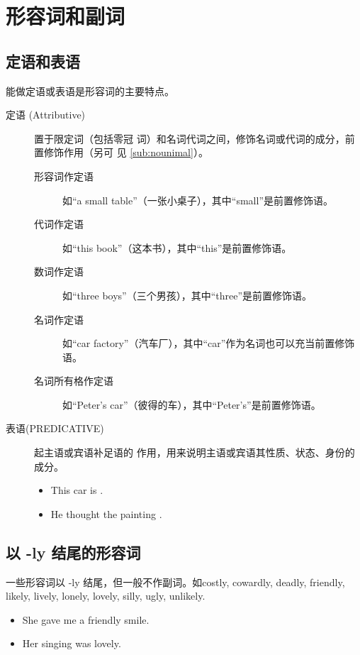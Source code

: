 \section{形容词和副词}

\subsection{定语和表语}
\label{sub:attrpred}

能做定语或表语是形容词的主要特点。

\begin{description}
\item[定语 (Attributive)]  置于限定词（包括零冠
  词）和名词代词之间，修饰名词或代词的成分，前置修饰作用（另可
  见 \cref{sub:nounimal}）。
  \begin{description}
    \item[形容词作定语] 如“a small table”（一张小桌子），其中“small”是前置修饰语。
    \item[代词作定语] 如“this book”（这本书），其中“this”是前置修饰语。
    \item[数词作定语] 如“three boys”（三个男孩），其中“three”是前置修饰语。
    \item[名词作定语] 如“car factory”（汽车厂），其中“car”作为名词也可以充当前置修饰语。
    \item[名词所有格作定语] 如“Peter’s car”（彼得的车），其中“Peter’s”是前置修饰语。
  \end{description}

\item[表语(PREDICATIVE)]  起主语或宾语补足语的
  作用，用来说明主语或宾语其性质、状态、身份的成分。
  \begin{itemize}
  \item This car is .

  \item He thought the painting .
  \end{itemize}
\end{description}

\subsection{以 -ly 结尾的形容词}

一些形容词以 -ly 结尾，但一般不作副词。如costly, cowardly, deadly, friendly,
likely, lively, lonely, lovely, silly, ugly, unlikely.
\begin{itemize}
\item She gave me a friendly smile.

\item Her singing was lovely.
\end{itemize}

